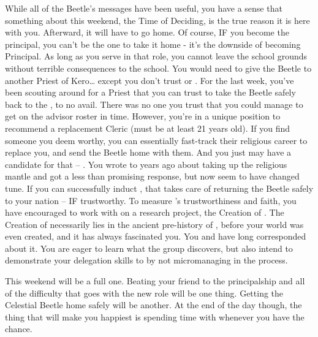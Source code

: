 \documentclass[char]{GL2020}
\begin{document}
While all of the Beetle's messages have been useful, you have a sense that something about this weekend, the Time of Deciding, is the true reason it is here with you. Afterward, it will have to go home. Of course, IF you become the principal, you can't be the one to take it home - it's the downside of becoming Principal. As long as you serve in that role, you cannot leave the school grounds without terrible consequences to the school. You would need to give the Beetle to another Priest of Kero\ldots{} except you don't trust  \cAntiChup{} or \cScholarship{}. For the last week, you've been scouting around for a Priest that you can trust to take the Beetle safely back to the \pTech{}, to no avail. There was no one you trust that you could manage to get on the advisor roster in time. However, you're in a unique position to recommend a replacement Cleric (must be at least 21 years old). If you find someone you deem worthy, you can essentially fast-track their religious career to replace you, and send the Beetle home with them. And you just may have a candidate for that – \cHeadScientist{\full}. You wrote to \cHeadScientist{} years ago about taking up the religious mantle and got a less than promising response, but now \cHeadScientist{\they} seem to have changed \cHeadScientist{\their} tune. If you can successfully induct \cHeadScientist{}, that takes care of returning the Beetle safely to your nation -- IF \cHeadScientist{\theyare} trustworthy. To measure \cHeadScientist{}'s trustworthiness and faith, you have encouraged \cHeadScientist{\them} to work with \cEbbPriest{} on a research project, the Creation of \pEarth{}. The Creation of \pEarth{} necessarily lies in the ancient pre-history of \pEarth{}, before your world was even created, and it has always fascinated you. You and \cEbbPriest{} have long corresponded about it. You are eager to learn what the group discovers, but also intend to demonstrate your delegation skills to \cPrincipal{} by not micromanaging \cHeadScientist{} in the process. 

This weekend will be a full one. Beating your friend \cMusic{} to the principalship and all of the difficulty that goes with the new role will be one thing. Getting the Celestial Beetle home safely will be another. At the end of the day though, the thing that will make you happiest is spending time with \cJuniorStatesman{} whenever you have the chance. 
\end{document}
